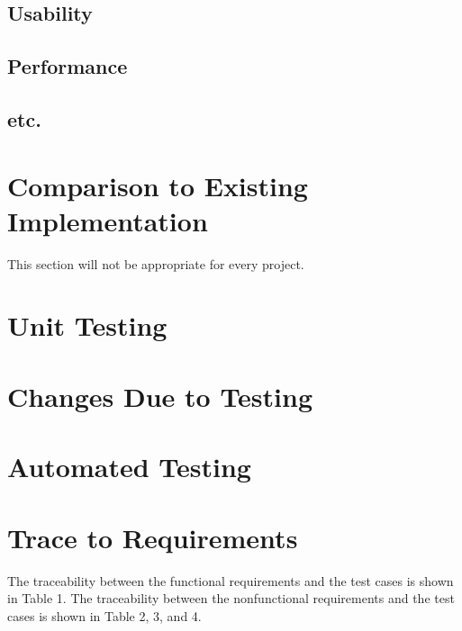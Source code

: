 \documentclass[12pt, titlepage]{article}
\begin{document}
\subsection{Usability}
		
\subsection{Performance}

\subsection{etc.}
	
\section{Comparison to Existing Implementation}	

This section will not be appropriate for every project.

\section{Unit Testing}

\section{Changes Due to Testing}


\section{Automated Testing}
		
\section{Trace to Requirements}
The traceability between the functional requirements and the test cases is shown in Table 1. The traceability between the nonfunctional requirements and the test cases is shown in Table 2, 3, and 4. 
\end{document}
